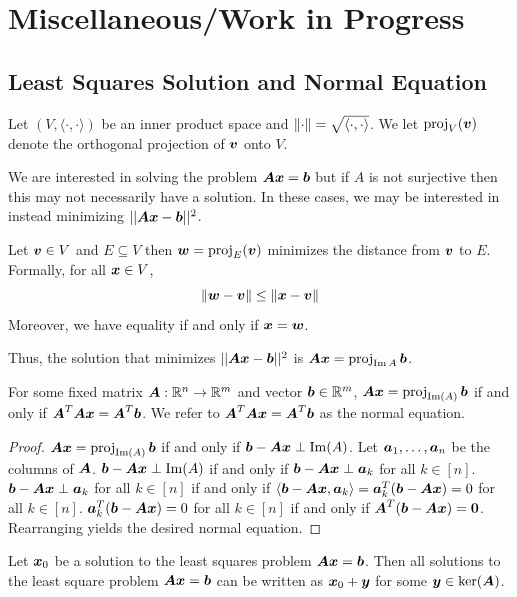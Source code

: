 \chapter{Miscellaneous/Work in Progress}

\section{Least Squares Solution and Normal Equation}
Let $(V,\langle\cdot,\cdot\rangle)$ be an inner product space and $\left\Vert\cdot\right\Vert=\sqrt{\langle\cdot,\cdot\rangle}$. We let $\operatorname{proj}_V(\boldsymbol{v})$ denote the orthogonal projection of $\boldsymbol{v}$ onto $V$.

We are interested in solving the problem $\boldsymbol{A}{\boldsymbol{x}}=\boldsymbol{b}$ but if $A$ is not surjective then this may not necessarily have a solution. In these cases, we may be interested in instead minimizing $||\boldsymbol{A}\boldsymbol{x}-\boldsymbol{b}||^2$.
\begin{theorem}\label{thm:proj_minimizer}
    Let $\boldsymbol{v}\in V$ and $E\subseteq V$ then $\boldsymbol{w}=\operatorname{proj}_E(\boldsymbol{v})$ minimizes the distance from $\boldsymbol{v}$ to $E$. Formally, for all $\boldsymbol{x}\in V$,
    \[
    \left\Vert\boldsymbol{w}-\boldsymbol{v}\right\Vert\leq\left\Vert\boldsymbol{x}-\boldsymbol{v}\right\Vert
    \]
    Moreover, we have equality if and only if $\boldsymbol{x}=\boldsymbol{w}$.
\end{theorem}
Thus, the solution that minimizes $||\boldsymbol{A}\boldsymbol{x}-\boldsymbol{b}||^2$ is $\boldsymbol{A}\boldsymbol{x}=\operatorname{proj}_{\operatorname{Im}{A}}\boldsymbol{b}$.
\begin{theorem}\label{thm:normalequation}
    For some fixed matrix $\boldsymbol{A}:\mathbb{R}^n\to\mathbb{R}^m$ and vector $\boldsymbol{b}\in\mathbb{R}^m$, $\boldsymbol{A}\boldsymbol{x}=\operatorname{proj}_{\operatorname{Im}(A)}\boldsymbol{b}$ if and only if $\boldsymbol{A}^T\boldsymbol{A}\boldsymbol{x}=\boldsymbol{A}^T\boldsymbol{b}$. We refer to $\boldsymbol{A}^T\boldsymbol{A}\boldsymbol{x}=\boldsymbol{A}^T\boldsymbol{b}$ as the normal equation.
\end{theorem}

\begin{proof}
    $\boldsymbol{A}\boldsymbol{x}=\operatorname{proj}_{\operatorname{Im}(A)}\boldsymbol{b}$ if and only if $\boldsymbol{b}-\boldsymbol{A}\boldsymbol{x}\perp\operatorname{Im}(A)$. Let $\boldsymbol{a}_1,\dots,\boldsymbol{a}_n$ be the columns of $\boldsymbol{A}$. $\boldsymbol{b}-\boldsymbol{A}\boldsymbol{x}\perp\operatorname{Im}(A)$ if and only if $\boldsymbol{b}-\boldsymbol{A}\boldsymbol{x}\perp\boldsymbol{a}_k$ for all $k\in[n]$. $\boldsymbol{b}-\boldsymbol{A}\boldsymbol{x}\perp\boldsymbol{a}_k$ for all $k\in[n]$ if and only if $\langle\boldsymbol{b}-\boldsymbol{A}\boldsymbol{x},\boldsymbol{a}_k\rangle=\boldsymbol{a}_k^T(\boldsymbol{b}-\boldsymbol{A}\boldsymbol{x})=0$ for all $k\in [n]$. $\boldsymbol{a}_k^T(\boldsymbol{b}-\boldsymbol{A}\boldsymbol{x})=0$ for all $k\in [n]$ if and only if $\boldsymbol{A}^T(\boldsymbol{b}-\boldsymbol{A}\boldsymbol{x})=\boldsymbol{0}$. Rearranging yields the desired normal equation.
\end{proof}

\begin{theorem}\label{thm:least_squares_sol_characterization}
    Let $\boldsymbol{x}_0$ be a solution to the least squares problem $\boldsymbol{A}\boldsymbol{x}=\boldsymbol{b}$. Then all solutions to the least square problem $\boldsymbol{A}\boldsymbol{x}=\boldsymbol{b}$ can be written as $\boldsymbol{x}_0+\boldsymbol{y}$ for some $\boldsymbol{y}\in\ker(\boldsymbol{A})$.
\end{theorem}


